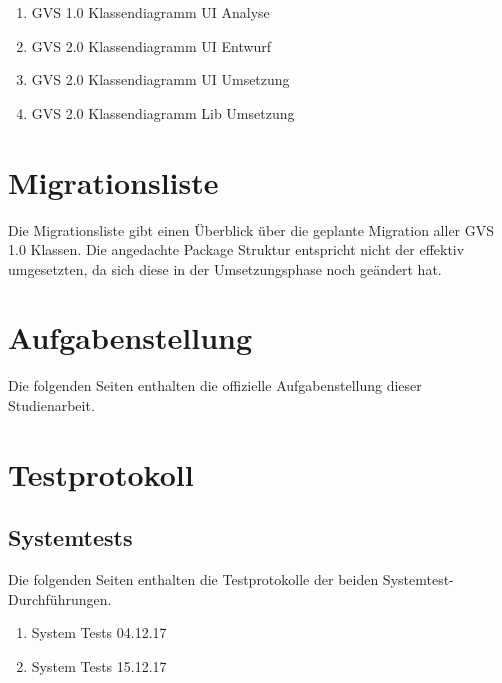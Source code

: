 \documentclass[11pt,a4paper,english,oneside]{book}
\numberwithin{equation}{chapter}
\begin{document}
	\begin{enumerate}
		\item GVS 1.0 Klassendiagramm UI Analyse
		\item GVS 2.0 Klassendiagramm UI Entwurf
		\item GVS 2.0 Klassendiagramm UI Umsetzung
		\item GVS 2.0 Klassendiagramm Lib Umsetzung
	\end{enumerate}
	
	
	
	
	
	
	\chapter{Migrationsliste} \label{ch:migration-list}
	Die Migrationsliste gibt einen Überblick über die geplante Migration aller GVS 1.0 Klassen. Die angedachte Package Struktur entspricht nicht der effektiv umgesetzten, da sich diese in der Umsetzungsphase noch geändert hat.
	
	
	
	\chapter{Aufgabenstellung}
	\label{aufgabenstellung}
	Die folgenden Seiten enthalten die offizielle Aufgabenstellung dieser Studienarbeit.
	
	
	
	\chapter{Testprotokoll} \label{Testprotokoll}
	\section{Systemtests}
	Die folgenden Seiten enthalten die Testprotokolle der beiden Systemtest-Durchführungen.	
	\begin{enumerate}
		\item System Tests 04.12.17
		\item System Tests 15.12.17
	\end{enumerate}

	
	
	
\end{document}
